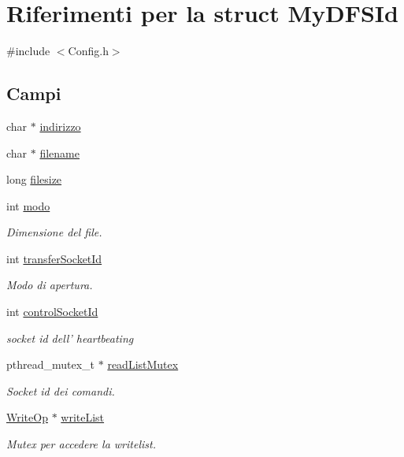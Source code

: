 \hypertarget{structMyDFSId}{\section{Riferimenti per la struct My\+D\+F\+S\+Id}
\label{structMyDFSId}
}


{\ttfamily \#include $<$Config.\+h$>$}

\subsection*{Campi}
\begin{DoxyCompactItemize}
\item 
char $\ast$ \hyperlink{structMyDFSId_ac8c10a1a5b18776bf5e5585ee9e26331}{indirizzo}
\item 
char $\ast$ \hyperlink{structMyDFSId_ac0e1b8c96d859982c1a7d49f9e929e48}{filename}
\item 
long \hyperlink{structMyDFSId_a394540d568f1fa235d096fd790d2891f}{filesize}
\item 
int \hyperlink{structMyDFSId_a98bc5ce1a7734459d8b81c997da4e9f0}{modo}
\begin{DoxyCompactList}\small\item\em Dimensione del file. \end{DoxyCompactList}\item 
int \hyperlink{structMyDFSId_a8d5f597502e29e2edc6d2f46c2323b1d}{transfer\+Socket\+Id}
\begin{DoxyCompactList}\small\item\em Modo di apertura. \end{DoxyCompactList}\item 
int \hyperlink{structMyDFSId_a4b67c0973fca25c75395e001b0bf8fc7}{control\+Socket\+Id}
\begin{DoxyCompactList}\small\item\em socket id dell' heartbeating \end{DoxyCompactList}\item 
pthread\+\_\+mutex\+\_\+t $\ast$ \hyperlink{structMyDFSId_a71f51c82d7133bfc16fcffeb4c395da0}{read\+List\+Mutex}
\begin{DoxyCompactList}\small\item\em Socket id dei comandi. \end{DoxyCompactList}\item 
\hyperlink{structWriteOp}{Write\+Op} $\ast$ \hyperlink{structMyDFSId_a0f7d2a9c60ddc649ee7e65b8b9295432}{write\+List}
\begin{DoxyCompactList}\small\item\em Mutex per accedere la writelist. \end{DoxyCompactList}\item 

\end{DoxyCompactItemize}

